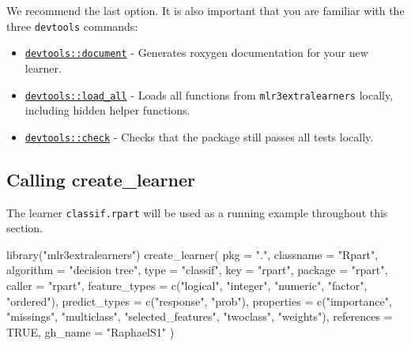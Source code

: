 \documentclass[
]{scrbook}
\newenvironment{Shaded}{\begin{snugshade}}{\end{snugshade}}
\newcommand{\AttributeTok}[1]{\textcolor[rgb]{0.77,0.63,0.00}{#1}}
\newcommand{\ConstantTok}[1]{\textcolor[rgb]{0.00,0.00,0.00}{#1}}
\newcommand{\FunctionTok}[1]{\textcolor[rgb]{0.00,0.00,0.00}{#1}}
\newcommand{\NormalTok}[1]{#1}
\newcommand{\StringTok}[1]{\textcolor[rgb]{0.31,0.60,0.02}{#1}}
\providecommand{\tightlist}{%
  \setlength{\itemsep}{0pt}\setlength{\parskip}{0pt}}
\renewenvironment{Shaded} {\begin{snugshade}\small} {\end{snugshade}}
\begin{document}
We recommend the last option. It is also important that you are familiar with the three \texttt{devtools} commands:

\begin{itemize}
\tightlist
\item
  \href{https://www.rdocumentation.org/packages/devtools/topics/document}{\texttt{devtools::document}} - Generates roxygen documentation for your new learner.
\item
  \href{https://www.rdocumentation.org/packages/devtools/topics/load_all}{\texttt{devtools::load\_all}} - Loads all functions from \texttt{mlr3extralearners} locally, including hidden helper functions.
\item
  \href{https://www.rdocumentation.org/packages/devtools/topics/check}{\texttt{devtools::check}} - Checks that the package still passes all tests locally.
\end{itemize}

\hypertarget{create-learner}{%
\subsection{Calling create\_learner}\label{create-learner}}

The learner \texttt{classif.rpart} will be used as a running example throughout this section.

\begin{Shaded}
\begin{Highlighting}[]
\FunctionTok{library}\NormalTok{(}\StringTok{"mlr3extralearners"}\NormalTok{)}
\FunctionTok{create\_learner}\NormalTok{(}
  \AttributeTok{pkg =} \StringTok{"."}\NormalTok{,}
  \AttributeTok{classname =} \StringTok{"Rpart"}\NormalTok{,}
  \AttributeTok{algorithm =} \StringTok{"decision tree"}\NormalTok{,}
  \AttributeTok{type =} \StringTok{"classif"}\NormalTok{,}
  \AttributeTok{key =} \StringTok{"rpart"}\NormalTok{,}
  \AttributeTok{package =} \StringTok{"rpart"}\NormalTok{,}
  \AttributeTok{caller =} \StringTok{"rpart"}\NormalTok{,}
  \AttributeTok{feature\_types =} \FunctionTok{c}\NormalTok{(}\StringTok{"logical"}\NormalTok{, }\StringTok{"integer"}\NormalTok{, }\StringTok{"numeric"}\NormalTok{, }\StringTok{"factor"}\NormalTok{, }\StringTok{"ordered"}\NormalTok{),}
  \AttributeTok{predict\_types =} \FunctionTok{c}\NormalTok{(}\StringTok{"response"}\NormalTok{, }\StringTok{"prob"}\NormalTok{),}
  \AttributeTok{properties =} \FunctionTok{c}\NormalTok{(}\StringTok{"importance"}\NormalTok{, }\StringTok{"missings"}\NormalTok{, }\StringTok{"multiclass"}\NormalTok{, }\StringTok{"selected\_features"}\NormalTok{, }\StringTok{"twoclass"}\NormalTok{, }\StringTok{"weights"}\NormalTok{),}
  \AttributeTok{references =} \ConstantTok{TRUE}\NormalTok{,}
  \AttributeTok{gh\_name =} \StringTok{"RaphaelS1"}
\NormalTok{)}
\end{Highlighting}
\end{Shaded}
\end{document}
